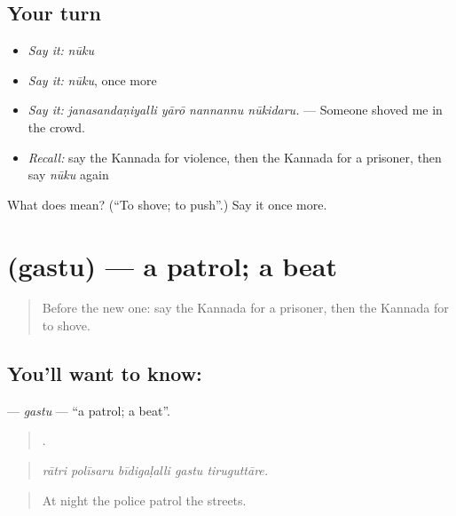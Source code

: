 \subsection*{Your turn}
\begin{itemize}
\raggedright
  \item \emph{Say it:} \emph{nūku}
  \item \emph{Say it:} \emph{nūku}, once more
  \item \emph{Say it:} \emph{janasandaṇiyalli yārō nannannu nūkidaru.} — Someone shoved me in the crowd.
  \item \emph{Recall:} say the Kannada for violence, then the Kannada for a prisoner, then say \emph{nūku} again
\end{itemize}

\begin{tcolorbox}[breakable,colback=teal!4,colframe=teal!35!black,title={Before you move on}]
What does  mean? (\textquotedblleft{}To shove; to push\textquotedblright{}.) Say it once more.
\end{tcolorbox}
\section[\texorpdfstring{\kn{ಗಸ್ತು} (gastu)}{ಗಸ್ತು (gastu)}]{ (gastu) — a patrol; a beat}

\label{lesson:KA-C365-gastu}



\begin{quote}
Before the new one: say the Kannada for a prisoner, then the Kannada for to shove.
\end{quote}

\subsection*{You'll want to know: }
\textbf{} — \emph{gastu} — \textquotedblleft{}a patrol; a beat\textquotedblright{}.

\begin{quote}
    .
\end{quote}

\begin{quote}
\emph{rātri polīsaru bīdigaḷalli gastu tiruguttāre.}
\end{quote}

\begin{quote}
At night the police patrol the streets.
\end{quote}

